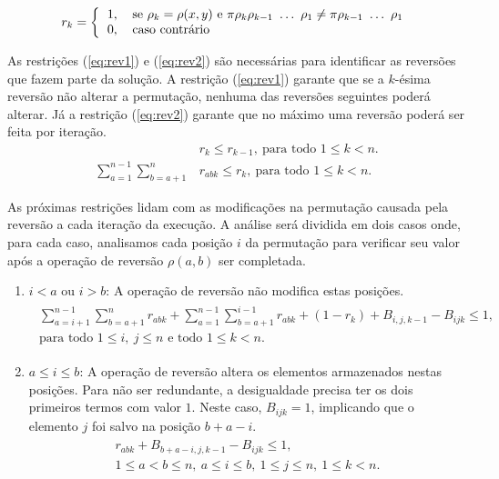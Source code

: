 \[
r_{k} = \left \{ 
\begin{tabular}{ll} 
 1, & se $\rho_{k} = \rho(x,y)$ e
 $\pi \rho_{k} \rho_{k-1}~\ldots~\rho_{1} \neq \pi \rho_{k-1}~\ldots~\rho_{1}$\\
 0, & caso contrário 
\end{tabular}
\right .
\]

As restrições (\ref{eq:rev1}) e (\ref{eq:rev2}) são necessárias para
identificar as reversões que fazem parte da solução. A restrição
(\ref{eq:rev1}) garante que se a $k$-ésima reversão não alterar a
permutação, nenhuma das reversões seguintes poderá alterar. Já a
restrição (\ref{eq:rev2}) garante que no máximo uma reversão poderá
ser feita por iteração.
\begin{align}
  &r_{k} \le r_{k-1},~\text{para todo $1 \le k <
  n$}. \label{eq:rev1} \\
  \sum_{a=1}^{n-1}\sum_{b=a+1}^{n}
  &r_{abk} \le r_{k},~\text{para todo $1 \le k < n$}. \label{eq:rev2}
\end{align}

As próximas restrições lidam com as modificações na permutação causada
pela reversão a cada iteração da execução. A análise será dividida em
dois casos onde, para cada caso, analisamos cada posição $i$ da
permutação para verificar seu valor após a operação de reversão
$\rho(a,b)$ ser completada.
\begin{enumerate}
\item{$i < a$ ou $i > b$:
A operação de reversão não modifica estas posições.
\begin{align}
  \begin{split}
    \sum_{a=i+1}^{n-1}\sum_{b=a+1}^{n} r_{abk} +
    \sum_{a=1}^{n-1}\sum_{b=a+1}^{i-1} r_{abk} +
    (1 - r_{k}) + B_{i,j,k-1} - B_{ijk} \le 1, \\
    \text{para todo $1 \le i,~j \le n$ e todo $1 \le k < n$}.
  \end{split}
  \label{eq:rev3}
\end{align}}
\item{$a \le i \le b$:
A operação de reversão altera os elementos armazenados nestas
posições. Para não ser redundante, a desigualdade precisa ter os dois
primeiros termos com valor $1$. Neste caso, $B_{ijk} = 1$,
implicando que o elemento $j$ foi salvo na posição $b + a - i$.
\begin{align}
  \begin{split}
  r_{abk} + B_{b+a-i,j,k-1} - B_{ijk} \le 1, \\
  \text{$1 \le a < b \le n,~a \le i \le b,~1 \le j
    \le n,~1 \le k < n$}.
  \end{split}
  \label{eq:rev4}
\end{align}}
\end{enumerate}

